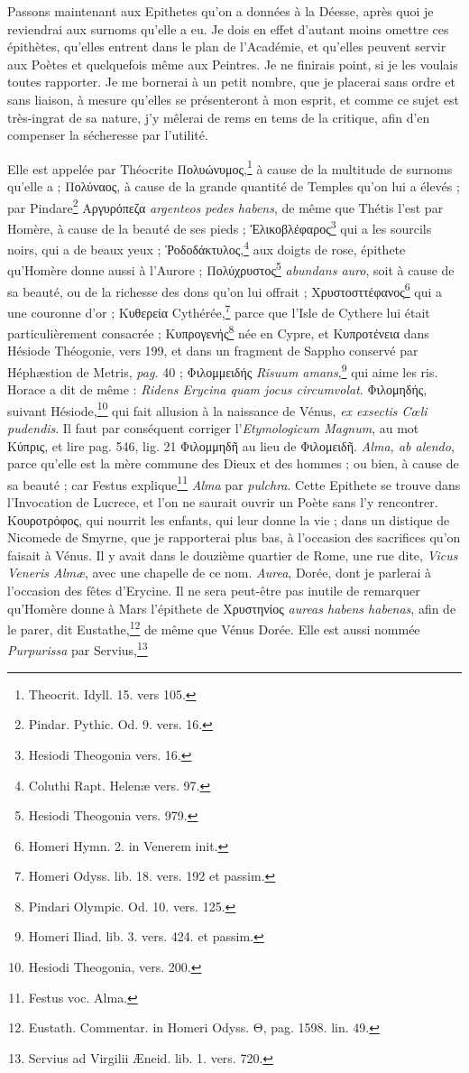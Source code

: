 \documentclass[a4paper, 11pt, oneside, polutonikogreek, french]{article}
\begin{document}
Passons maintenant aux Epithetes qu'on a données à la Déesse, après quoi je reviendrai aux surnoms qu'elle a eu. Je dois en effet d'autant moins omettre ces épithètes, qu'elles entrent dans le plan de l'Académie, et qu'elles peuvent servir aux Poètes et quelquefois même aux Peintres. Je ne finirais point, si je les voulais toutes rapporter. Je me bornerai à un petit nombre, que je placerai sans ordre et sans liaison, à mesure qu'elles se présenteront à mon esprit, et comme ce sujet est très-ingrat de sa nature, j'y mêlerai de rems en tems de la critique, afin d'en compenser la sécheresse par l'utilité.

Elle est appelée par Théocrite Πολυώνυμος,\footnote{Theocrit. Idyll. 15. vers 105.} à cause de la multitude de surnoms qu'elle a ; Πολύναος, à cause de la grande quantité de Temples qu'on lui a élevés ; par Pindare\footnote{Pindar. Pythic. Od. 9. vers. 16.} Αργυρόπεζα \emph{argenteos pedes habens}, de même que Thétis l'est par Homère, à cause de la beauté de ses pieds ; Ἐλικοβλέφαρος\footnote{Hesiodi Theogonia vers. 16.} qui a les sourcils noirs, qui a de beaux yeux ; Ῥοδοδάκτυλος,\footnote{Coluthi Rapt. Helenæ vers. 97.} aux doigts de rose, épithete qu'Homère donne aussi à l'Aurore ; Πολύχρυστος\footnote{Hesiodi Theogonia vers. 979.} \emph{abundans auro}, soit à cause de sa beauté, ou de la richesse des dons qu'on lui offrait ; Χρυστοσττέφανος\footnote{Homeri Hymn. 2. in Venerem init.} qui a une couronne d'or ; Κυθερεία Cythérée,\footnote{Homeri Odyss. lib. 18. vers. 192 et passim.} parce que l'Isle de Cythere lui était particulièrement consacrée ; Κυπρογενής\footnote{Pindari Olympic. Od. 10. vers. 125.} née en Cypre, et Κυπροτένεια dans Hésiode Théogonie, vers 199, et dans un fragment de Sappho conservé par Héphæstion de Metris, \emph{pag.} 40 ; Φιλομμειδής \emph{Risuum amans},\footnote{Homeri Iliad. lib. 3. vers. 424. et passim.} qui aime les ris. Horace a dit de même : \emph{Ridens Erycina quam jocus circumvolat}. Φιλομηδής, suivant Hésiode,\footnote{Hesiodi Theogonia, vers. 200.} qui fait allusion à la naissance de Vénus, \emph{ex exsectis Cœli pudendis}. Il faut par conséquent corriger l'\emph{Etymologicum Magnum}, au mot Κύπρις, et lire pag. 546, lig. 21 Φιλομμηδῆ au lieu de Φιλομειδῆ. \emph{Alma, ab alendo}, parce qu'elle est la mère commune des Dieux et des hommes ; ou bien, à cause de sa beauté ; car Festus explique\footnote{Festus voc. Alma.} \emph{Alma} par \emph{pulchra}. Cette Epithete se trouve dans l'Invocation de Lucrece, et l'on ne saurait ouvrir un Poète sans l'y rencontrer. Κουροτρόφος, qui nourrit les enfants, qui leur donne la vie ; dans un distique de Nicomede de Smyrne, que je rapporterai plus bas, à l'occasion des sacrifices qu'on faisait à Vénus. Il y avait dans le douzième quartier de Rome, une rue dite, \emph{Vicus Veneris Almæ}, avec une chapelle de ce nom. \emph{Aurea}, Dorée, dont je parlerai à l'occasion des fêtes d'Erycine. Il ne sera peut-être pas inutile de remarquer qu'Homère donne à Mars l'épithete de Χρυστηνίος \emph{aureas habens habenas}, afin de le parer, dit Eustathe,\footnote{Eustath. Commentar. in Homeri Odyss. Θ, pag. 1598. lin. 49.} de même que Vénus Dorée. Elle est aussi nommée \emph{Purpurissa} par Servius,\footnote{Servius ad Virgilii Æneid. lib. 1. vers. 720.} 
\end{document}
